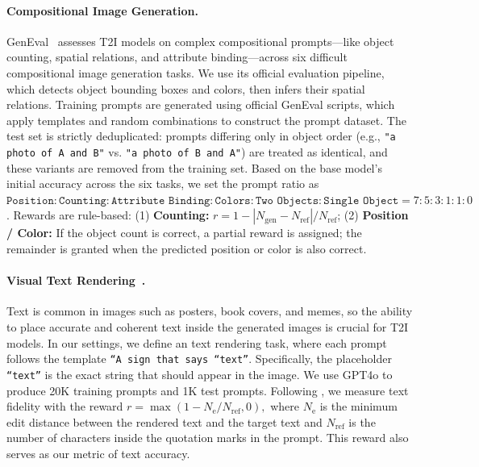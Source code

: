 \paragraph{Compositional Image Generation.}\label{subsec:exp-geneval}
GenEval~\cite{geneval} assesses T2I models on complex compositional prompts—like object counting, spatial relations, and attribute binding—across six difficult compositional image generation tasks. We use its official evaluation pipeline, which detects object bounding boxes and colors, then infers their spatial relations. Training prompts are generated using official GenEval scripts, which apply templates and random combinations to construct the prompt dataset. The test set is strictly deduplicated: prompts differing only in object order (e.g., \texttt{"a photo of A and B"} vs. \texttt{"a photo of B and A"}) are treated as identical, and these variants are removed from the training set. Based on the base model's initial accuracy across the six tasks, we set the prompt ratio as \( \texttt{Position}:\texttt{Counting}:\texttt{Attribute Binding}:\texttt{Colors}:\texttt{Two Objects}:\texttt{Single Object} = 7:5:3:1:1:0\).
Rewards are rule-based: (1) \textbf{Counting:} \( r = 1-|N_{\text{gen}} - N_{\text{ref}}| / N_{\text{ref}} \); (2) \textbf{Position / Color:} If the object count is correct, a partial reward is assigned; the remainder is granted when the predicted position or color is also correct.

\paragraph{Visual Text Rendering~\cite{textdiffuser}.}\label{subsec:exp-text_rendering}
Text is common in images such as posters, book covers, and memes, so the ability to place accurate and coherent text inside the generated images is crucial for T2I models.
In our settings, we define an text rendering task, where each prompt follows the template \texttt{``A sign that says ``text''}.
Specifically,
the placeholder \texttt{``text''} is the exact string that should appear in the image.
We use GPT4o to produce 20K training prompts and 1K test prompts. Following \cite{seedream2}, we measure text fidelity with the reward
\(
r = \max (1-N_{\text{e}}/N_{\text{ref}}, 0),
\)
where \( N_{\text{e}} \) is the minimum edit distance
between the rendered text and the target text and \( N_{\text{ref}} \) is the number of characters inside the quotation marks in the prompt. This reward also serves as our metric of text accuracy.



